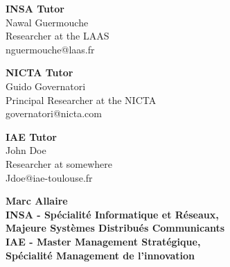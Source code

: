 \documentclass[10pt]{article}
\begin{document}
\begin{titlepage}
\vspace{1.3cm}
\begin{center}
\begin{minipage}{.3\textwidth}
\begin{center}
\textbf{INSA Tutor}\\
Nawal Guermouche\\
Researcher at the LAAS\\
nguermouche@laas.fr
\end{center}
\end{minipage}
\begin{minipage}{.3\textwidth}
\begin{center}
\textbf{NICTA Tutor}\\
Guido Governatori\\
Principal Researcher at the NICTA\\
governatori@nicta.com
\end{center}
\end{minipage}
\begin{minipage}{.3\textwidth}
\begin{center}
\textbf{IAE Tutor}\\
John Doe\\
Researcher at somewhere\\
Jdoe@iae-toulouse.fr
\end{center}
\end{minipage}
\end{center}

\vfill
\begin{minipage}{0.55\textwidth}
\begin{flushleft}
\textbf{\large Marc Allaire\\[.5cm] 
\small INSA - Spécialité Informatique et Réseaux,\\\hspace{.5cm}Majeure Systèmes Distribués Communicants\\
IAE - Master Management Stratégique,\\\hspace{.5cm}Spécialité Management de l'innovation}
\end{flushleft}
\end{minipage}
\begin{minipage}{0.4\textwidth}
\begin{flushright}
\textbf{}
\end{flushright}
\end{minipage}


\end{titlepage}
\end{document}
